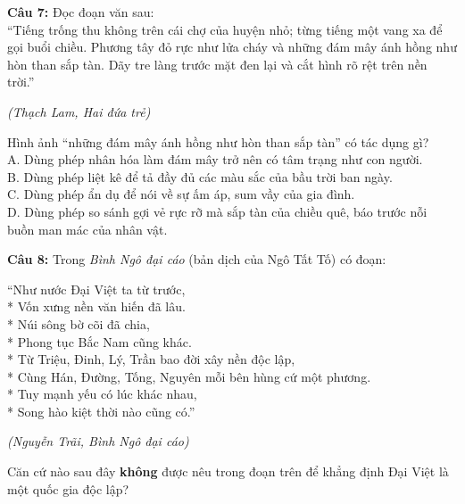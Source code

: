 \documentclass[12pt,a4paper]{article}
\begin{document}


\vspace{0.3cm}

\noindent \textbf{Câu 7:} Đọc đoạn văn sau:\\
``Tiếng trống thu không trên cái chợ của huyện nhỏ; từng tiếng một vang xa để gọi buổi chiều. Phương tây đỏ rực như lửa cháy và những đám mây ánh hồng như hòn than sắp tàn. Dãy tre làng trước mặt đen lại và cắt hình rõ rệt trên nền trời.''
\begin{flushright}\small\textit{(Thạch Lam, Hai đứa trẻ)}\end{flushright}
Hình ảnh ``những đám mây ánh hồng như hòn than sắp tàn'' có tác dụng gì?\\
\noindent A. Dùng phép nhân hóa làm đám mây trở nên có tâm trạng như con người.\\
\noindent B. Dùng phép liệt kê để tả đầy đủ các màu sắc của bầu trời ban ngày.\\
\noindent C. Dùng phép ẩn dụ để nói về sự ấm áp, sum vầy của gia đình.\\
\noindent D. Dùng phép so sánh gợi vẻ rực rỡ mà sắp tàn của chiều quê, báo trước nỗi buồn man mác của nhân vật.



\vspace{0.3cm}

\noindent \textbf{Câu 8:} Trong \textit{Bình Ngô đại cáo} (bản dịch của Ngô Tất Tố) có đoạn:
\begin{center}
``Như nước Đại Việt ta từ trước,\\*
Vốn xưng nền văn hiến đã lâu.\\*
Núi sông bờ cõi đã chia,\\*
Phong tục Bắc Nam cũng khác.\\*
Từ Triệu, Đinh, Lý, Trần bao đời xây nền độc lập,\\*
Cùng Hán, Đường, Tống, Nguyên mỗi bên hùng cứ một phương.\\*
Tuy mạnh yếu có lúc khác nhau,\\*
Song hào kiệt thời nào cũng có.''
\end{center}
\begin{flushright}\small\textit{(Nguyễn Trãi, Bình Ngô đại cáo)}\end{flushright}
Căn cứ nào sau đây \textbf{không} được nêu trong đoạn trên để khẳng định Đại Việt là một quốc gia độc lập?\\
\noindent{}\\
\noindent{}
\end{document}
